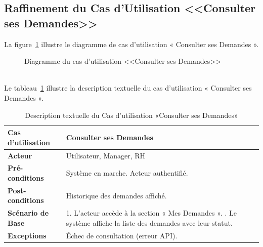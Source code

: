 \subsection{Raffinement du Cas d'Utilisation <<Consulter ses Demandes>>}
La figure~\ref{fig:usecase_view_requests} illustre le diagramme de cas d'utilisation « Consulter ses Demandes ».
\begin{figure}[h]
     \centering
     \caption{Diagramme du cas d'utilisation <<Consulter ses Demandes>>}
     \label{fig:usecase_view_requests}
\end{figure}\\
Le tableau~\ref{tab:view_requests} illustre la description textuelle du cas d’utilisation « Consulter ses Demandes ».
\newpage
\begin{table}[!ht]
\centering
\caption{Description textuelle du Cas d’utilisation «Consulter ses Demandes»}
\label{tab:view_requests}
\renewcommand{\arraystretch}{1.2}
\begin{tabular}{|p{4.2cm}|p{11cm}|}
\hline
\textbf{Cas d'utilisation} & Consulter ses Demandes \\
\hline
\textbf{Acteur} & Utilisateur, Manager, RH \\
\hline
\textbf{Pré-conditions} & Système en marche. \newline Acteur authentifié. \\
\hline
\textbf{Post-conditions} & Historique des demandes affiché. \\
\hline
\textbf{Scénario de Base} & 
1. L’acteur accède à la section « Mes Demandes ». \newline
2. Le système affiche la liste des demandes avec leur statut. \\
\hline
\textbf{Exceptions} & 
Échec de consultation (erreur API). \\
\hline
\end{tabular}
\end{table}
